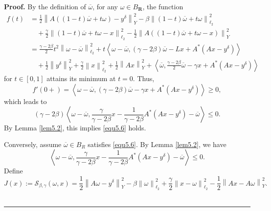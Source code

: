 \documentclass[a4paper,12pt]{article}
\numberwithin{equation}{section}
\newenvironment{proof}[1][Proof]{\textbf{#1.} }
{\ \rule{0.75em}{0.75em}\smallskip}
\begin{document}
\begin{proof}
    By the definition of $\overline{\omega}$, for any $\omega\in B_{\mathbf{R}}$, the function
    \begin{align*}
        f\left(t\right)
        & =\frac{1}{2}\left\|A\left(\left(1-t\right)\overline{\omega}+t\omega\right)- y^{\delta}\right\|_{Y}^{2}- \beta\left\|\left(1-t\right)\overline{\omega}+t\omega\right\|_{\ell_{2}}^{2}\\
        & \quad +\frac{\gamma}{2}\left\|\left(1-t\right)\overline{\omega}+t\omega -x\right\|_{\ell_{2}}^{2}-\frac{1}{2}\left\|A\left(\left(1-t\right)\overline{\omega} +t\omega-x\right)\right\|_{Y}^{2} \\
        & =\frac{\gamma-2\beta}{2}t^{2} \left\|\omega-\overline{\omega}\right\|_{\ell_{2}}^{2}+ t\left<\omega-\overline{\omega},\left(\gamma-2\beta\right)\overline{\omega}-Lx+ A^{*}\left(Ax-y^{\delta}\right)\right> \\
        & \quad +\frac{1}{2}\left\|y^{\delta}\right\|_{Y}^{2}+\frac{\gamma}{2}\left\|x\right\|_{\ell_{2}}^{2} +\frac{1}{2}\left\|Ax\right\|_{Y}^{2}+\left<\overline{\omega}, \frac{\gamma-2\beta}{2}\overline{\omega}-\gamma x+ A^{*}\left(Ax-y^{\delta}\right)\right>
    \end{align*}
    for $t\in [0,1]$ attains its minimum at $t=0$. Thus,
    \begin{equation*}
        f'\left(0+\right)=\left<\omega-\overline{\omega},\left(\gamma-2\beta\right)\overline{\omega}-\gamma x+ A^{*}\left(Ax-y^{\delta}\right)\right>\geq 0,
    \end{equation*}
     which leads to
    \begin{equation*}
        \left(\gamma-2\beta\right)\left<\omega-\overline{\omega}, \frac{\gamma}{\gamma-2\beta}x-\frac{1}{\gamma-2\beta} A^{*}\left(Ax-y^{\delta}\right)-\overline{\omega}\right>\leq 0.
    \end{equation*}
    By Lemma \ref{lem5.2}, this implies \eqref{equ5.6} holds.
    \par Conversely, assume $\overline{\omega}\in B_{R}$ satisfies \eqref{equ5.6}. By Lemma \ref{lem5.2}, we have
    \begin{equation*}
        \left<\omega-\overline{\omega},\frac{\gamma}{\gamma-2\beta}x -\frac{1}{\gamma-2\beta}A^{*}\left(Ax-y^{\delta}\right)-\overline{\omega}\right>\leq 0.
    \end{equation*}
    Define
    \begin{equation*}
        J\left(x\right):= \mathcal{S}_{\beta,\gamma}(\omega,x)= \frac{1}{2}\left\|A\omega-y^{\delta}\right\|_{Y}^{2}- \beta\left\|\omega\right\|_{\ell_{2}}^{2} +\frac{\gamma}{2}\left\|x-\omega\right\|_{\ell_{2}}^{2} -\frac{1}{2}\left\|Ax-A\omega\right\|_{Y}^{2}.

\end{equation*}
\end{proof}
\end{document}
